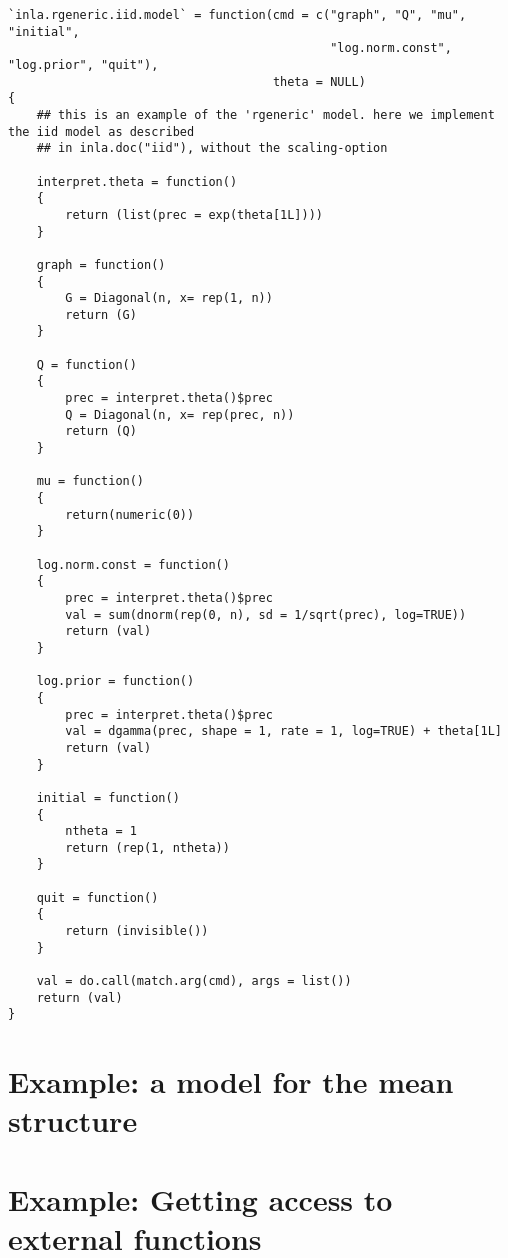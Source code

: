 \documentclass[a4paper,11pt]{article}
\begin{document}
{\small
\begin{verbatim}
`inla.rgeneric.iid.model` = function(cmd = c("graph", "Q", "mu", "initial",
                                             "log.norm.const", "log.prior", "quit"),
                                     theta = NULL)
{
    ## this is an example of the 'rgeneric' model. here we implement the iid model as described
    ## in inla.doc("iid"), without the scaling-option

    interpret.theta = function()
    {
        return (list(prec = exp(theta[1L])))
    }

    graph = function()
    {
        G = Diagonal(n, x= rep(1, n))
        return (G)
    }

    Q = function()
    {
        prec = interpret.theta()$prec
        Q = Diagonal(n, x= rep(prec, n))
        return (Q)
    }

    mu = function()
    {
        return(numeric(0))
    }

    log.norm.const = function()
    {
        prec = interpret.theta()$prec
        val = sum(dnorm(rep(0, n), sd = 1/sqrt(prec), log=TRUE))
        return (val)
    }

    log.prior = function()
    {
        prec = interpret.theta()$prec
        val = dgamma(prec, shape = 1, rate = 1, log=TRUE) + theta[1L]
        return (val)
    }

    initial = function()
    {
        ntheta = 1
        return (rep(1, ntheta))
    }

    quit = function()
    {
        return (invisible())
    }

    val = do.call(match.arg(cmd), args = list())
    return (val)
}
\end{verbatim}
}

\clearpage
\section*{Example: a model for the mean structure}

{\small

}

\section*{Example: Getting access to external functions}
\end{document}
